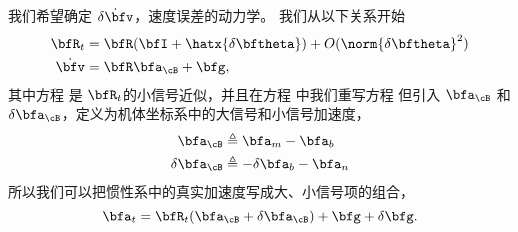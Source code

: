 我们希望确定 $\dot{\delta\bfv}$，速度误差的动力学。 
我们从以下关系开始
%
%
\begin{align}
\bfR_t &= \bfR(\bfI+\hatx{\delta\bftheta})  + O(\norm{\delta\bftheta}^2) \label{equ:Rt}\\
\dot\bfv &= \bfR\bfa_\cB + \bfg, \label{equ:vdot2}
\end{align}%
%
其中方程  是 $\bfR_t$的小信号近似，并且在方程  中我们重写方程  但引入 $\bfa_\cB$ 和 $\delta\bfa_\cB$，定义为机体坐标系中的大信号和小信号加速度，
%
%
\begin{align}
\bfa_\cB &\triangleq \bfa_m - \bfa_b \label{equ:nomacc}\\
\delta\bfa_\cB &\triangleq -\delta\bfa_b - \bfa_n  \label{equ:pertacc}
\end{align}%
%
所以我们可以把惯性系中的真实加速度写成大、小信号项的组合，
%
\begin{equation}
\bfa_t = \bfR_t(\bfa_\cB+\delta\bfa_\cB) + \bfg + \delta\bfg.
\end{equation}%

